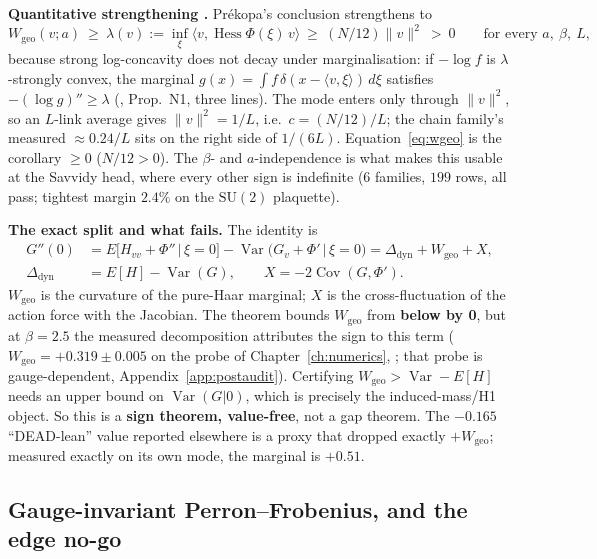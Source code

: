 \textbf{Quantitative strengthening \LT.} Pr\'ekopa's conclusion strengthens to
\begin{equation}
W_{\mathrm{geo}}(v;a)\ \ge\ \lambda(v):=\inf_\xi\bigl\langle v,\operatorname{Hess}\Phi(\xi)\,v
\bigr\rangle\ \ge\ (N/12)\|v\|^2\ >\ 0
\qquad\text{for every } a,\ \beta,\ L ,
\label{eq:wgeo-quant}
\end{equation}
because strong log-concavity does not decay under marginalisation: if $-\log f$ is $\lambda$-strongly
convex, the marginal $g(x)=\int f\,\delta(x-\langle v,\xi\rangle)\,d\xi$ satisfies
$-(\log g)''\ge\lambda$ (, Prop.~N1, three lines). The mode enters only
through $\|v\|^2$, so an $L$-link average gives $\|v\|^2=1/L$, i.e.\ $c=(N/12)/L$; the chain family's
measured $\approx0.24/L$ sits on the right side of $1/(6L)$. Equation~\eqref{eq:wgeo} is the corollary
$\ge0$ ($N/12>0$). The $\beta$- and $a$-independence is what makes this usable at the Savvidy head,
where every other sign is indefinite ($6$ families, $199$ rows, all pass; tightest margin $2.4\%$ on
the $\mathrm{SU}(2)$ plaquette).

\textbf{The exact split and what fails.} The identity is
\begin{equation}
\begin{aligned}
G''(0)&=E\bigl[H_{vv}+\Phi''\,\big|\,\xi=0\bigr]
        -\operatorname{Var}\bigl(G_v+\Phi'\,\big|\,\xi=0\bigr)
        =\Delta_{\mathrm{dyn}}+W_{\mathrm{geo}}+X,\\
\Delta_{\mathrm{dyn}}&=E[H]-\operatorname{Var}(G),\qquad
X=-2\operatorname{Cov}(G,\Phi').
\end{aligned}
\label{eq:split}
\end{equation}
$W_{\mathrm{geo}}$ is the curvature of the pure-Haar marginal; $X$ is the cross-fluctuation of
the action force with the Jacobian. The theorem bounds $W_{\mathrm{geo}}$ from \textbf{below by
0}, but at $\beta=2.5$ the measured decomposition attributes the sign to this term
($W_{\mathrm{geo}}=+0.319\pm0.005$ on the probe of Chapter~\ref{ch:numerics}, \LE; that probe is
gauge-dependent, Appendix~\ref{app:postaudit}). Certifying
$W_{\mathrm{geo}}>\operatorname{Var}-E[H]$ needs an upper bound on $\operatorname{Var}(G|0)$,
which is precisely the induced-mass/H1 object. So this is a \textbf{sign theorem, value-free},
not a gap theorem. The $-0.165$ ``DEAD-lean'' value reported elsewhere is a proxy that dropped
exactly $+W_{\mathrm{geo}}$; measured exactly on its own mode, the marginal is $+0.51$.

\subsection{Gauge-invariant Perron--Frobenius, and the edge no-go}

